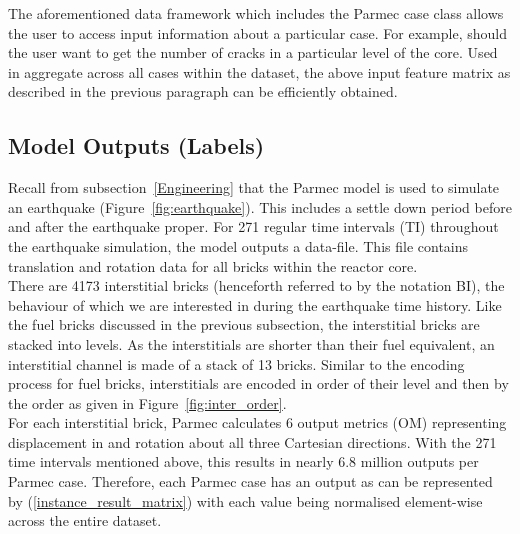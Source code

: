 \noindent
The aforementioned data framework which includes the Parmec case class allows the user to access input information about a particular case.  For example, should the user want to get the number of cracks in a particular level of the core. Used in aggregate across all cases within the dataset, the above input feature matrix as described in the previous paragraph can be efficiently obtained. 


\subsection{Model Outputs (Labels)} \label{data:outputs}


Recall from subsection~\ref{Engineering} that the Parmec model is used to simulate an earthquake (Figure~\ref{fig:earthquake}). This includes a settle down period before and after the earthquake proper. For 271 regular time intervals (TI) throughout the earthquake simulation, the model outputs a data-file. This file contains translation and rotation data for all bricks within the reactor core. 
\\

\noindent
There are 4173 interstitial bricks (henceforth referred to by the notation BI), the behaviour of which we are interested in during the earthquake time history. Like the fuel bricks discussed in the previous subsection, the interstitial bricks are stacked into levels. As the interstitials are shorter than their fuel equivalent, an interstitial channel is made of a stack of 13 bricks. Similar to the encoding process for fuel bricks, interstitials are encoded in order of their level and then by the order as given in Figure~\ref{fig:inter_order}.
\\

\noindent
For each interstitial brick, Parmec calculates 6 output metrics (OM) representing displacement in and rotation about all three Cartesian directions. With the 271 time intervals mentioned above, this results in nearly 6.8 million outputs per Parmec case. Therefore, each Parmec case has an output as can be represented by (\ref{instance_result_matrix}) with each value being normalised element-wise across the entire dataset.  
\\

